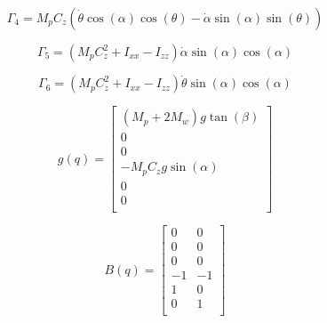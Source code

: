 \documentclass{article}
\begin{document}
\begin{equation}
    \Gamma_4=M_pC_z(\dot{\theta}\cos(\alpha)\cos(\theta)-\dot{\alpha}\sin(\alpha)\sin(\theta))
    \label{eq:13}
\end{equation}

\begin{equation}
    \Gamma_5=(M_pC^2_z+I_{xx}-I_{zz})\dot{\alpha}\sin(\alpha)\cos(\alpha)
    \label{eq:14}
\end{equation}

\begin{equation}
    \Gamma_6=(M_pC^2_z+I_{xx}-I_{zz})\dot{\theta}\sin(\alpha)\cos(\alpha)
    \label{eq:15}
\end{equation}

\begin{equation}
    g(q)= \begin{bmatrix}
        (M_p+2M_w)g\tan(\beta) \\
        0 \\
        0 \\
        -M_pC_zg\sin(\alpha) \\
        0 \\
        0\\
    \end{bmatrix}
    \label{eq:16}
\end{equation}

\begin{equation}
    B(q)= \begin{bmatrix}
        0 & 0 \\
        0 & 0 \\
        0 & 0 \\
        -1 & -1 \\
        1 & 0 \\
        0 & 1\\
    \end{bmatrix}
    \label{eq:17}
\end{equation}
\end{document}

